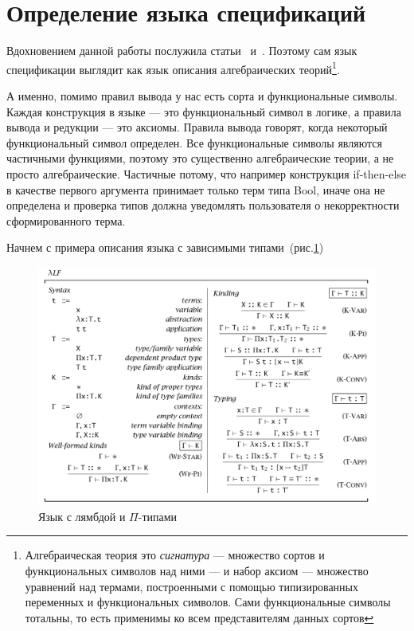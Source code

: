 \section{Определение языка спецификаций}\label{lang_spec}




Вдохновением данной работы послужила статьи~\cite{Palmgren} и~\cite{isaev}. Поэтому сам язык спецификации выглядит как язык описания алгебраических теорий\footnote{Алгебраическая теория это \textit{сигнатура} --- множество сортов и функциональных символов над ними --- и набор аксиом --- множество уравнений над термами, построенными с помощью типизированных переменных и функциональных символов. Сами функциональные символы тотальны, то есть применимы ко всем представителям данных сортов}.

А именно, помимо правил вывода у нас есть сорта и функциональные символы. Каждая конструкция в языке --- это функциональный символ в логике, а правила вывода и редукции --- это аксиомы. Правила вывода говорят, когда некоторый функциональный символ определен. Все функциональные символы являются частичными функциями, поэтому это существенно алгебраические теории, а не просто алгебраические. Частичные потому, что например конструкция if-then-else в качестве первого аргумента принимает только терм типа Bool, иначе она не определена и проверка типов должна уведомлять пользователя о некорректности сформированного терма.

Начнем с примера описания языка с зависимыми типами~(рис.\ref{lpi})~\cite[Глава~2.1]{book:pierce}

\begin{figure}
    \centering
	\includegraphics[scale=0.35]{img/lp.png}
	\caption{Язык с лямбдой и $\Pi$-типами }
	\label{lpi}
\end{figure}

